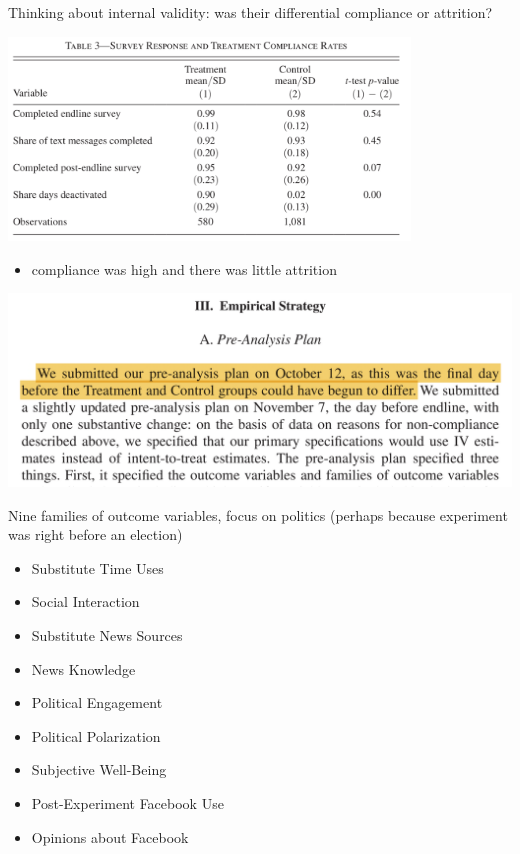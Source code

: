 \documentclass[aspectratio=169]{beamer}
\begin{document}
\begin{frame}

Thinking about internal validity: was their differential compliance or attrition? \pause

\begin{center}
\includegraphics[width=0.8\textwidth]{figures/allcott_welfare_2020_tab3}
\end{center}

\begin{itemize}
\item compliance was high and there was little attrition 
\end{itemize}

\end{frame}
\begin{frame}

\begin{center}
\includegraphics[width=1\textwidth]{figures/allcott_welfare_2020_preanalysis}
\end{center}

\end{frame}
\begin{frame}

Nine families of outcome variables, focus on politics (perhaps because experiment was right before an election)
\begin{itemize}
\item Substitute Time Uses
\item Social Interaction
\item Substitute News Sources
\item News Knowledge
\item Political Engagement
\item Political Polarization
\item Subjective Well-Being
\item Post-Experiment Facebook Use
\item Opinions about Facebook
\end{itemize}

\end{frame}
\end{document}
